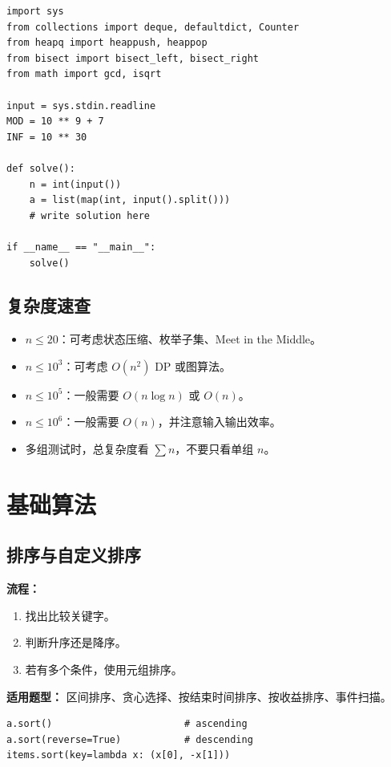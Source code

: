 \documentclass[UTF8,a4paper,14pt]{ctexart}
\begin{document}
\begin{lstlisting}
import sys
from collections import deque, defaultdict, Counter
from heapq import heappush, heappop
from bisect import bisect_left, bisect_right
from math import gcd, isqrt

input = sys.stdin.readline
MOD = 10 ** 9 + 7
INF = 10 ** 30

def solve():
    n = int(input())
    a = list(map(int, input().split()))
    # write solution here

if __name__ == "__main__":
    solve()
\end{lstlisting}

\subsection{复杂度速查}

\begin{itemize}
  \item $n \le 20$：可考虑状态压缩、枚举子集、Meet in the Middle。
  \item $n \le 10^3$：可考虑 $O(n^2)$ DP 或图算法。
  \item $n \le 10^5$：一般需要 $O(n\log n)$ 或 $O(n)$。
  \item $n \le 10^6$：一般需要 $O(n)$，并注意输入输出效率。
  \item 多组测试时，总复杂度看 $\sum n$，不要只看单组 $n$。
\end{itemize}

\section{基础算法}

\subsection{排序与自定义排序}

\textbf{流程：}
\begin{enumerate}
  \item 找出比较关键字。
  \item 判断升序还是降序。
  \item 若有多个条件，使用元组排序。
\end{enumerate}

\textbf{适用题型：}
区间排序、贪心选择、按结束时间排序、按收益排序、事件扫描。

\begin{lstlisting}
a.sort()                       # ascending
a.sort(reverse=True)           # descending
items.sort(key=lambda x: (x[0], -x[1]))
\end{lstlisting}
\end{document}

